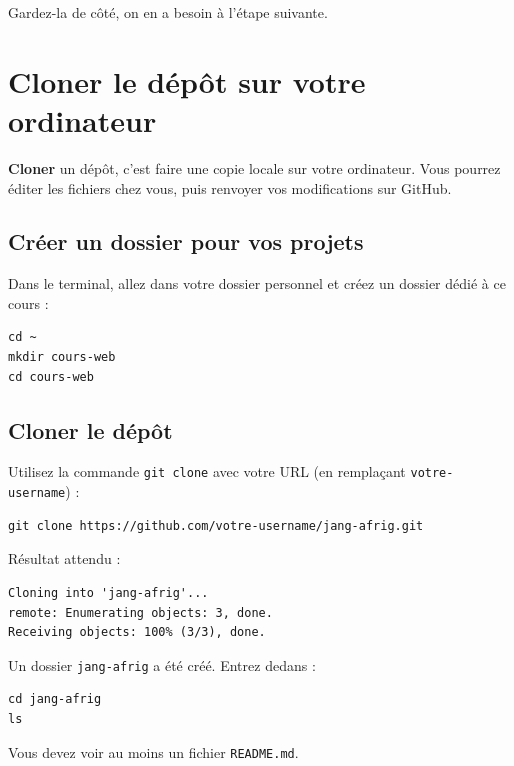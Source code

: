 \documentclass[11pt,a4paper]{article}
\begin{document}
Gardez-la de côté, on en a besoin à l'étape suivante.

\newpage

\section{Cloner le dépôt sur votre ordinateur}

\textbf{Cloner} un dépôt, c'est faire une copie locale sur votre ordinateur.
Vous pourrez éditer les fichiers chez vous, puis renvoyer vos modifications
sur GitHub.

\subsection{Créer un dossier pour vos projets}

Dans le terminal, allez dans votre dossier personnel et créez un dossier
dédié à ce cours :

\begin{lstlisting}
cd ~
mkdir cours-web
cd cours-web
\end{lstlisting}

\subsection{Cloner le dépôt}

Utilisez la commande \texttt{git clone} avec votre URL (en remplaçant
\texttt{votre-username}) :

\begin{lstlisting}
git clone https://github.com/votre-username/jang-afrig.git
\end{lstlisting}

Résultat attendu :

\begin{lstlisting}
Cloning into 'jang-afrig'...
remote: Enumerating objects: 3, done.
Receiving objects: 100% (3/3), done.
\end{lstlisting}

Un dossier \texttt{jang-afrig} a été créé. Entrez dedans :

\begin{lstlisting}
cd jang-afrig
ls
\end{lstlisting}

Vous devez voir au moins un fichier \texttt{README.md}.
\end{document}
